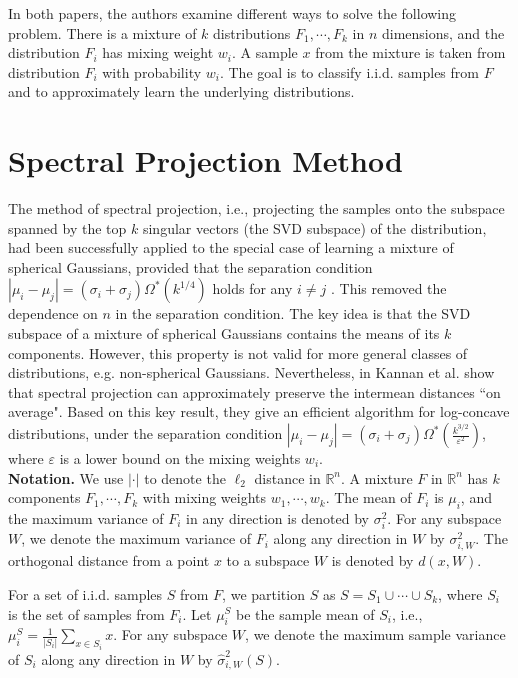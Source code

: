 \documentclass[11pt,letter]{article}
\begin{document}
In both papers, the authors examine different ways to solve the following problem. There is a mixture of $k$ distributions $F_1, \cdots, F_k$ in $n$ dimensions, and the distribution $F_i$ has mixing weight $w_i$. A sample $x$ from the mixture is taken from distribution $F_i$ with probability $w_i$. The goal is to classify i.i.d. samples from $F$ and to approximately learn the underlying distributions.

\section{Spectral Projection Method}


The method of spectral projection, i.e., projecting the samples onto the subspace spanned by the top $k$ singular vectors (the SVD subspace) of the distribution, had been successfully applied to the special case of learning a mixture of spherical Gaussians, provided that the separation condition $|\mu_i - \mu_j| = (\sigma_i + \sigma_j) \Omega^*(k^{1/4})$ holds for any $i\not=j$ \cite{Vempala02aspectral}. This removed the dependence on $n$ in the separation condition. The key idea is that the SVD subspace of a mixture of spherical Gaussians contains the means of its $k$ components. However, this property is not valid for more general classes of distributions, e.g. non-spherical Gaussians.
Nevertheless, in \cite{Kannan08spectral} Kannan et al. show that spectral projection can approximately preserve the intermean distances ``on average". Based on this key result, they give an efficient algorithm for log-concave distributions, under the separation condition $|\mu_i - \mu_j| = (\sigma_i + \sigma_j) \Omega^*\left(\frac{k^{3/2}}{\varepsilon^2}\right)$, where $\varepsilon$ is a lower bound on the mixing weights $w_i$.\\

\noindent\textbf{Notation.}
We use $|\cdot|$ to denote the $\ell_2$ distance in $\mathbb R^n$.
A mixture $F$ in $\mathbb R^n$ has $k$ components $F_1, \cdots, F_k$ with mixing weights $w_1, \cdots, w_k$. The mean of $F_i$ is $\mu_i$, and the maximum variance of $F_i$ in any direction is denoted by $\sigma_i^2$. For any subspace $W$, we denote the maximum variance of $F_i$ along any direction in $W$ by $\sigma_{i, W}^2$.
The orthogonal distance from a point $x$ to a subspace $W$ is denoted by $d(x, W)$.

For a set of i.i.d. samples $S$ from $F$, we partition $S$ as $S = S_1 \cup \cdots \cup S_k$, where $S_i$ is the set of samples from $F_i$. Let $\mu_i^S$ be the sample mean of $S_i$, i.e.,
$\mu_i^S = \frac{1}{|S_i|} \sum_{x\in S_i} x$.
For any subspace $W$, we denote the maximum sample variance of $S_i$ along any direction in $W$ by $\hat \sigma_{i, W}^2(S)$.
\end{document}
